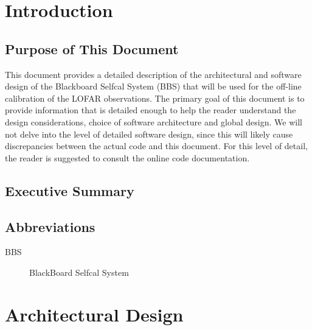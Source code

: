 \documentclass[10pt]{lofar}
\begin{document}
\maketitle
\newpage
%
\theDistributionList
\vspace{1cm}
\theDocumentRevision
\newpage
%
\begin{abstract}
\end{abstract}
\newpage
%
\tableofcontents
\newpage
%


\section{Introduction}
\label{sec:introduction}

\subsection{Purpose of This Document}
\label{subsec:purpose}
%
This document provides a detailed description of the architectural and
software design of the Blackboard Selfcal System (BBS) that will be used for
the off-line calibration of the LOFAR observations. The primary goal of this
document is to provide information that is detailed enough to help the reader
understand the design considerations, choice of software architecture and
global design. We will not delve into the level of detailed software design,
since this will likely cause discrepancies between the actual code and this
document. For this level of detail, the reader is suggested to consult the
online code documentation.

\subsection{Executive Summary}
\label{subsec:summary}

\subsection{Abbreviations}
\label{subsec:abbrev}
\begin{description}
\item [BBS] BlackBoard Selfcal System
\end{description}

\pagebreak

\section{Architectural Design}
\label{sec:architectural-design}
\end{document}
